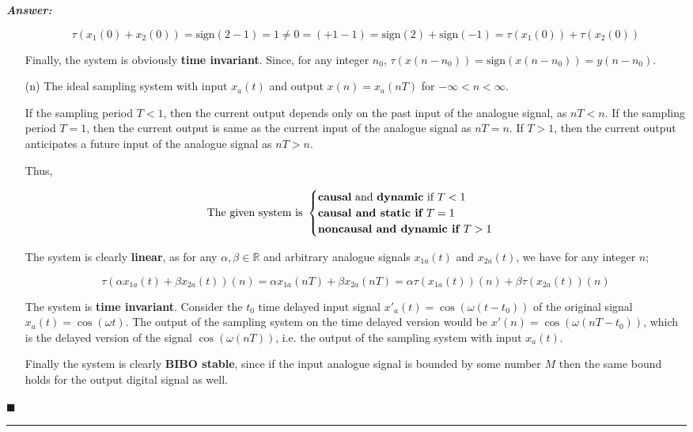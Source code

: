 \documentclass[12pt]{article}
\theoremstyle{definition}
\newenvironment{answer}{
    \textbf{\textit{Answer:}} \qquad
}{\hfill $\blacksquare$ \\ \begin{center}
    \rule{0.6\linewidth}{0.5px}    
\end{center}
}
\newcommand{\R}{\mathbb{R}}
\begin{document}
\begin{answer}
\begin{enumerate}
        $$
        \tau(x_1(0) + x_2(0)) = \text{sign}(2-1) = 1 \neq 0 = (+1 - 1) = \text{sign}(2) + \text{sign}(-1) = \tau(x_1(0)) + \tau(x_2(0))
        $$

        Finally, the system is obviously \textbf{time invariant}. Since, for any integer $n_0$, $\tau(x(n-n_0)) = \text{sign}(x(n-n_0)) = y(n-n_0)$.

        \item[(n)] The ideal sampling system with input $x_a(t)$ and output $x(n) = x_a(nT)$ for $-\infty < n < \infty$.  
        
        If the sampling period $T < 1$, then the current output depends only on the past input of the analogue signal, as $nT < n$. If the sampling period $T = 1$, then the current output is same as the current input of the analogue signal as $nT = n$. If $T > 1$, then the current output anticipates a future input of the analogue signal as $nT > n$.

        Thus,

        $$
        \text{The given system is } \begin{cases}
            \text{\textbf{causal} and \textbf{dynamic} if } T < 1\\
            \textbf{\textbf{causal} and \textbf{static} if } T = 1\\
            \textbf{\textbf{noncausal} and \textbf{dynamic} if } T > 1\\
        \end{cases}
        $$

        The system is clearly \textbf{linear}, as for any $\alpha, \beta \in \R$ and arbitrary analogue signals $x_{1a}(t)$ and $x_{2a}(t)$, we have for any integer $n$;

        $$
        \tau(\alpha x_{1a}(t) + \beta x_{2a}(t))(n) = \alpha x_{1a}(nT) + \beta x_{2a}(nT) = \alpha \tau(x_{1a}(t))(n) + \beta \tau(x_{2a}(t))(n)
        $$

        The system is \textbf{time invariant}. Consider the $t_0$ time delayed input signal $x'_a(t) = \cos(\omega(t - t_0))$ of the original signal $x_a(t) = \cos(\omega t)$. The output of the sampling system on the time delayed version would be $x'(n) = \cos(\omega(nT - t_0))$, which is the delayed version of the signal $\cos(\omega (nT))$, i.e. the output of the sampling system with input $x_a(t)$.

        Finally the system is clearly \textbf{BIBO stable}, since if the input analogue signal is bounded by some number $M$ then the same bound holds for the output digital signal as well.
    \end{enumerate}
\end{answer}
\end{document}
